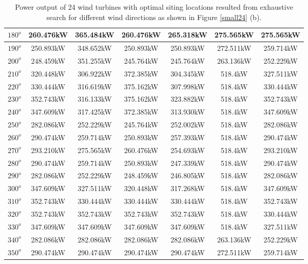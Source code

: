 \begin{table}[H]
\begin{tabular}{|c|c|c|c|c|c|c|}
		$180^o$	& 260.476kW	& 365.484kW	& 260.476kW	& 265.318kW	& 275.565kW	& 275.565kW	\\ \hline
		$190^o$	& 250.893kW	& 348.652kW	& 250.893kW	& 250.893kW	& 272.511kW	& 259.714kW	\\ \hline
		$200^o$	& 248.459kW	& 351.255kW	& 245.764kW	& 245.764kW	& 263.136kW	& 252.229kW	\\ \hline
		$210^o$	& 320.448kW	& 306.922kW	& 372.385kW	& 304.345kW	& 518.4kW	& 327.511kW	\\ \hline
		$220^o$	& 330.444kW	& 316.619kW	& 375.162kW	& 307.998kW	& 518.4kW	& 330.444kW	\\ \hline
		$230^o$	& 352.743kW	& 316.133kW	& 375.162kW	& 323.882kW	& 518.4kW	& 352.743kW	\\ \hline
		$240^o$	& 347.609kW	& 317.425kW	& 372.385kW	& 313.930kW	& 518.4kW	& 347.609kW	\\ \hline
		$250^o$	& 282.086kW	& 252.229kW	& 245.764kW	& 252.002kW	& 518.4kW	& 282.086kW	\\ \hline
		$260^o$	& 290.474kW	& 259.714kW	& 250.893kW	& 257.393kW	& 518.4kW	& 290.474kW	\\ \hline
		$270^o$	& 293.210kW	& 275.565kW	& 260.476kW	& 254.693kW	& 518.4kW	& 293.210kW	\\ \hline
		$280^o$	& 290.474kW	& 259.714kW	& 250.893kW	& 247.339kW	& 518.4kW	& 290.474kW	\\ \hline
		$290^o$	& 282.086kW	& 252.229kW	& 248.459kW	& 246.805kW	& 518.4kW	& 282.086kW	\\ \hline
		$300^o$	& 347.609kW	& 327.511kW	& 320.448kW	& 317.268kW	& 518.4kW	& 347.609kW	\\ \hline
		$310^o$	& 352.743kW	& 330.444kW	& 330.444kW	& 330.444kW	& 518.4kW	& 352.743kW	\\ \hline
		$320^o$	& 352.743kW	& 352.743kW	& 352.743kW	& 352.743kW	& 518.4kW	& 330.444kW	\\ \hline
		$330^o$	& 347.609kW	& 347.609kW	& 347.609kW	& 347.609kW	& 518.4kW	& 327.511kW	\\ \hline
		$340^o$	& 282.086kW	& 282.086kW	& 282.086kW	& 282.086kW	& 263.136kW	& 252.229kW	\\ \hline
		$350^o$	& 290.474kW	& 290.474kW	& 290.474kW	& 290.474kW	& 272.511kW	& 259.714kW	\\ \hline
        	\end{tabular}
        	\caption{Power output of 24 wind turbines with optimal siting locations resulted from exhaustive search for different wind directions as shown in Figure \ref{small24} (b).}
        	\label{table24b}
        \end{table}
